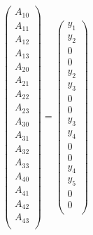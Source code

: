 \documentclass[russian,utf8,nocolumnxxxi,nocolumnxxxii]{eskdtext}
\begin{document}
{\begin{equation}
\left(
\begin{array}{c}
A_{10} \\
A_{11} \\
A_{12} \\
A_{13} \\
A_{20} \\
A_{21} \\
A_{22} \\
A_{23} \\
A_{30} \\
A_{31} \\
A_{32} \\
A_{33} \\
A_{40} \\
A_{41} \\
A_{42} \\
A_{43} \\
\end{array}
\right)
=
\left(
\begin{array}{c}
y_1 \\
y_2 \\
0 \\
0 \\
y_2 \\
y_3 \\
0 \\
0 \\
y_3 \\
y_4 \\
0 \\
0 \\
y_4 \\
y_5 \\
0 \\
0 \\
\end{array}
\right)
\end{equation}
}
\end{document}
